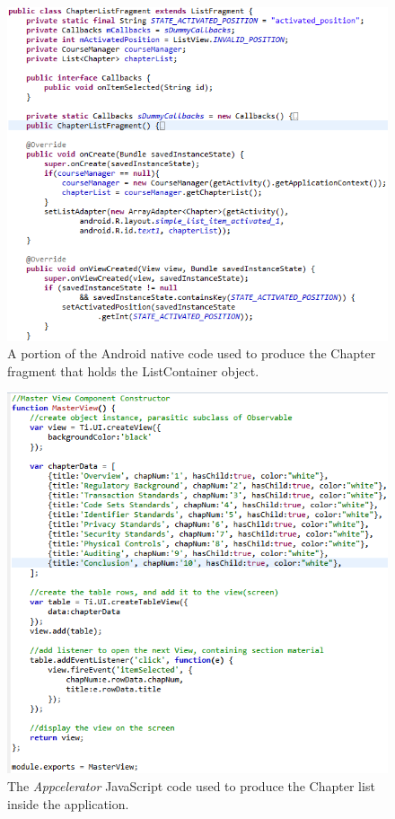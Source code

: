 \documentclass[11pt, twocolumn]{article}
\begin{document}
\begin{figure}[h!]
\includegraphics[scale=0.5]{android-chapter-fragment-code}
\caption{A portion of the Android native code used to produce the Chapter fragment that holds the ListContainer object.}
\end{figure}

\begin{figure}[h]
\includegraphics[scale=0.62]{appcelerator-chapter-code}
\caption{The {\it Appcelerator} JavaScript code used to produce the Chapter list inside the application.}
\end{figure}
\end{document}
